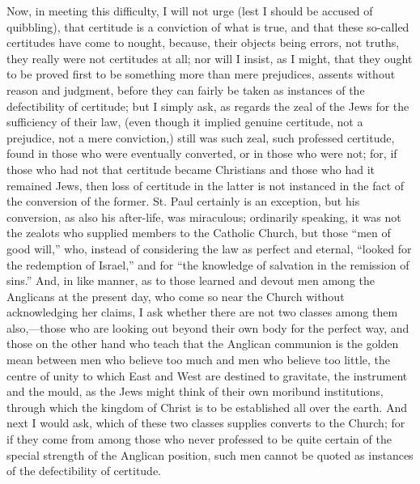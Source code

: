 Now, in meeting this difficulty, I will not urge (lest I should be
accused of quibbling), that certitude is a conviction of what is true,
and that these so-called certitudes have come to nought, because,
their objects being errors, not truths, they really were not
certitudes at all; nor will I insist, as I might, that they ought to
be proved first to be something more than mere prejudices, assents
without reason and judgment, before they can fairly be taken as
instances of the defectibility of certitude; but I simply ask, as
regards the zeal of the Jews for the sufficiency of their law,
(even though it implied genuine certitude, not a prejudice, not a mere
conviction,) still was such zeal, such professed certitude, found in
those who were eventually converted, or in those who were not; for, if
those who had not that certitude became Christians and those who had
it remained Jews, then loss of certitude in the latter is not
instanced in the fact of the conversion of the former. St. Paul
certainly is an exception, but his conversion, as also his after-life,
was miraculous; ordinarily speaking, it was not the zealots who
supplied members to the Catholic Church, but those ``men of good
will,'' who, instead of considering the law as perfect and
eternal, ``looked for the redemption of Israel,'' and for
``the knowledge of salvation in the remission of sins.'' And,
in like manner, as to those learned and devout men among the Anglicans
at the present day, who come so near the Church without acknowledging
her claims, I ask whether there are not two classes among them also,—those
who are looking out beyond their own body for the perfect way, and
those on the other hand who teach that the Anglican communion is the
golden mean between men who believe too much and men who believe too
little, the centre of unity to which East and West are destined to
gravitate, the instrument and the mould, as the Jews might think of
their own moribund institutions, through which the kingdom of Christ
is to be established all over the earth. And next I would ask, which
of these two classes supplies converts to the Church; for if they come
from among those who never professed to be quite certain of the
special strength of the Anglican position, such men cannot be quoted
as instances of the defectibility of certitude.

